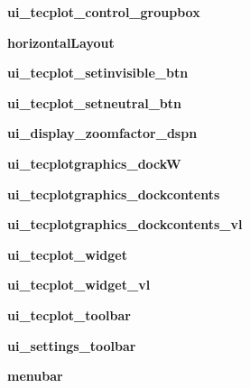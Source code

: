 \begin{DoxyCompactItemize}
\item 
\hypertarget{a00105_a1ed7a735f4879c9335af120f50f99554}{}\label{a00105_a1ed7a735f4879c9335af120f50f99554} 
{\bfseries ui\+\_\+tecplot\+\_\+control\+\_\+groupbox}
\item 
\hypertarget{a00105_ae4ccda1baa67cbf1b90aeaf28c792f52}{}\label{a00105_ae4ccda1baa67cbf1b90aeaf28c792f52} 
{\bfseries horizontal\+Layout}
\item 
\hypertarget{a00105_a7efc66f5379a990bb2d613efad8af792}{}\label{a00105_a7efc66f5379a990bb2d613efad8af792} 
{\bfseries ui\+\_\+tecplot\+\_\+setinvisible\+\_\+btn}
\item 
\hypertarget{a00105_a7a5d64ed74f4a2a389cfbd88660084ea}{}\label{a00105_a7a5d64ed74f4a2a389cfbd88660084ea} 
{\bfseries ui\+\_\+tecplot\+\_\+setneutral\+\_\+btn}
\item 
\hypertarget{a00105_aab2a02b2ad9ef412370fa6ce21aba778}{}\label{a00105_aab2a02b2ad9ef412370fa6ce21aba778} 
{\bfseries ui\+\_\+display\+\_\+zoomfactor\+\_\+dspn}
\item 
\hypertarget{a00105_a6ac6813ef0dc08cb729b515d9edfd656}{}\label{a00105_a6ac6813ef0dc08cb729b515d9edfd656} 
{\bfseries ui\+\_\+tecplotgraphics\+\_\+dockW}
\item 
\hypertarget{a00105_a833a8408dc99f9eedbb331e8e360bdf5}{}\label{a00105_a833a8408dc99f9eedbb331e8e360bdf5} 
{\bfseries ui\+\_\+tecplotgraphics\+\_\+dockcontents}
\item 
\hypertarget{a00105_a9937dfdabe6438f3bfec3ba0c6976557}{}\label{a00105_a9937dfdabe6438f3bfec3ba0c6976557} 
{\bfseries ui\+\_\+tecplotgraphics\+\_\+dockcontents\+\_\+vl}
\item 
\hypertarget{a00105_a7e3ee3296fa5786336d90635c2442045}{}\label{a00105_a7e3ee3296fa5786336d90635c2442045} 
{\bfseries ui\+\_\+tecplot\+\_\+widget}
\item 
\hypertarget{a00105_a617fa074367d63edd758567a5d67b398}{}\label{a00105_a617fa074367d63edd758567a5d67b398} 
{\bfseries ui\+\_\+tecplot\+\_\+widget\+\_\+vl}
\item 
\hypertarget{a00105_afbd7bdb7c0f0d9d24bad52a80454d101}{}\label{a00105_afbd7bdb7c0f0d9d24bad52a80454d101} 
{\bfseries ui\+\_\+tecplot\+\_\+toolbar}
\item 
\hypertarget{a00105_a34720910fa97b9e65de72cbee6a12803}{}\label{a00105_a34720910fa97b9e65de72cbee6a12803} 
{\bfseries ui\+\_\+settings\+\_\+toolbar}
\item 
\hypertarget{a00105_a265e28ccad6c1cd4a94a22965fe6c536}{}\label{a00105_a265e28ccad6c1cd4a94a22965fe6c536} 
{\bfseries menubar}
\item 

\end{DoxyCompactItemize}
